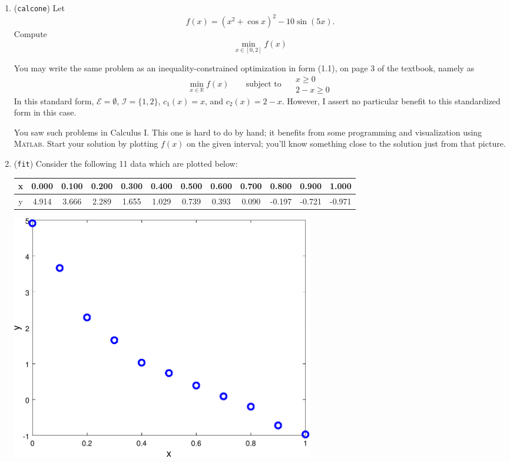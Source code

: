 \documentclass[11pt]{amsart}
\newcommand{\RR}{\mathbb{R}}
\newcommand{\Matlab}{\textsc{Matlab}\xspace}
\begin{document}
\bigskip
\renewcommand{\labelenumi}{\Roman{enumi}. \quad}
\begin{enumerate}
\item (\texttt{calcone})  \quad Let
    $$f(x) = \left(x^2 + \cos x\right)^2 - 10 \sin(5 x).$$
Compute
    $$\min_{x\in [0,2]} f(x)$$

You may write the same problem as an inequality-constrained optimization in form (1.1), on page 3 of the textbook, namely as
	$$\min_{x\in\RR} f(x) \qquad \text{subject to }\quad \begin{matrix} x \ge 0 \\ 2 - x \ge 0\end{matrix}$$
In this standard form, $\mathcal{E}=\emptyset$, $\mathcal{I}=\{1,2\}$, $c_1(x)=x$, and $c_2(x)=2-x$.  However, I assert no particular benefit to this standardized form in this case.

You saw such problems in Calculus I.  This one is hard to do by hand; it benefits from some programming and visualization using \Matlab.  Start your solution by plotting $f(x)$ on the given interval; you'll know something close to the solution just from that picture.


\medskip
\item (\texttt{fit})  \quad Consider the following 11 data which are plotted below:

\bigskip
\begin{tabular}{c|ccccccccccc}
x & 0.000 & 0.100 & 0.200 & 0.300 & 0.400 & 0.500 & 0.600 & 0.700 &  0.800 &  0.900 &  1.000 \\
\hline
y & 4.914 & 3.666 & 2.289 & 1.655 & 1.029 & 0.739 & 0.393 & 0.090 & -0.197 & -0.721 & -0.971
\end{tabular}

\bigskip
\begin{center}
\includegraphics[width=0.6\textwidth]{fitdata}
\end{center}


\end{enumerate}
\end{document}
